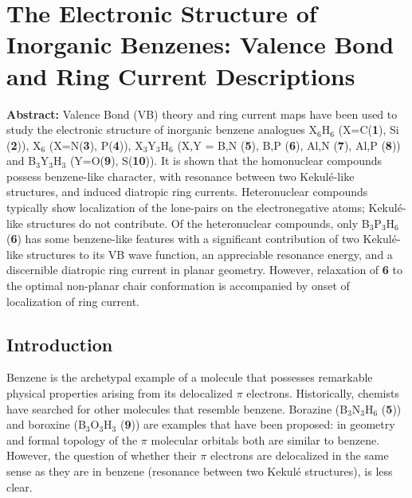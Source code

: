 \chapter{The Electronic Structure of Inorganic Benzenes: Valence Bond and Ring Current Descriptions}
\label{chap_inorganic}


\noindent\textbf{Abstract:}  Valence Bond (VB) theory and ring current maps have been used to study the electronic structure of inorganic benzene analogues X$_6$H$_6$ (X=C(\textbf{1}), Si (\textbf{2})),
X$_6$ (X=N(\textbf{3}), P(\textbf{4})), X$_3$Y$_3$H$_6$ (X,Y = B,N
(\textbf{5}), B,P (\textbf{6}), Al,N (\textbf{7}), Al,P (\textbf{8})) and
B$_3$Y$_3$H$_3$ (Y=O(\textbf{9}), S(\textbf{10})).
It is shown that the homonuclear compounds possess benzene-like character, with
resonance between two Kekul\'e-like structures, and induced diatropic
ring currents. Heteronuclear compounds typically show localization of the
lone-pairs on the electronegative atoms; Kekul\'e-like structures do not
contribute. Of the heteronuclear compounds, only B$_3$P$_3$H$_6$ (\textbf{6})
has some benzene-like features with a
significant contribution of two Kekul\'e-like structures to its VB wave
function, an appreciable resonance energy, and a discernible diatropic
ring current in planar geometry. However, relaxation of \textbf{6} to the optimal non-planar
chair conformation is accompanied by onset of localization of ring current.

\newpage

\section{Introduction}

Benzene is the archetypal example of a molecule that possesses remarkable
physical properties arising from its delocalized $\pi$ electrons.
Historically, chemists have searched for other molecules that resemble
benzene. Borazine (B$_3$N$_3$H$_6$ (\textbf{5})) and boroxine (B$_3$O$_3$H$_3$ (\textbf{9}))
are examples that have been proposed: in geometry and formal topology of the
$\pi$ molecular orbitals both are similar to benzene. However, the question of
whether their $\pi$ electrons are delocalized in the same sense as they are in
benzene (resonance between two Kekul\'e structures), is less clear. 

